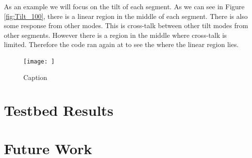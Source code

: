 As an example we will focus on the tilt of each segment.  As we can see in Figure \ref{fig:Tilt_100}, there is a linear region in the middle of each segment.  There is also some response from other modes.  This is cross-talk between other tilt modes from other segments.  However there is a region in the middle where cross-talk is limited.  Therefore the code ran again at to see the where the linear region lies.

\begin{figure}
    \centering
    \texttt{[image: ]}
    \caption{Caption}
    \label{fig:my_label}
\end{figure}

\section{Testbed Results}
\label{sec:testbed}


\section{Future Work}
\label{sec:future}